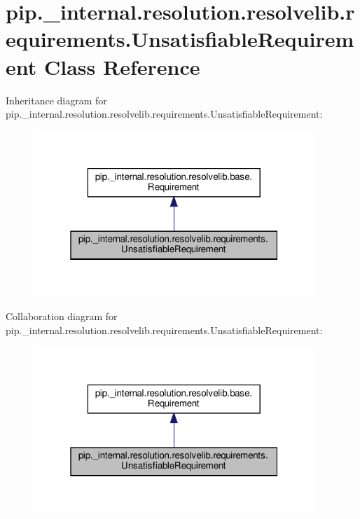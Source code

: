 \hypertarget{classpip_1_1__internal_1_1resolution_1_1resolvelib_1_1requirements_1_1UnsatisfiableRequirement}{}\section{pip.\+\_\+internal.\+resolution.\+resolvelib.\+requirements.\+Unsatisfiable\+Requirement Class Reference}
\label{classpip_1_1__internal_1_1resolution_1_1resolvelib_1_1requirements_1_1UnsatisfiableRequirement}


Inheritance diagram for pip.\+\_\+internal.\+resolution.\+resolvelib.\+requirements.\+Unsatisfiable\+Requirement\+:
\nopagebreak
\begin{figure}[H]
\begin{center}
\leavevmode
\includegraphics[width=301pt]{classpip_1_1__internal_1_1resolution_1_1resolvelib_1_1requirements_1_1UnsatisfiableRequirement__inherit__graph}
\end{center}
\end{figure}


Collaboration diagram for pip.\+\_\+internal.\+resolution.\+resolvelib.\+requirements.\+Unsatisfiable\+Requirement\+:
\nopagebreak
\begin{figure}[H]
\begin{center}
\leavevmode
\includegraphics[width=301pt]{classpip_1_1__internal_1_1resolution_1_1resolvelib_1_1requirements_1_1UnsatisfiableRequirement__coll__graph}
\end{center}
\end{figure}
